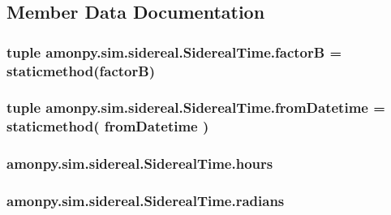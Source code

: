 \subsection{Member Data Documentation}
\hypertarget{classamonpy_1_1sim_1_1sidereal_1_1_sidereal_time_ada951b9a3bf9c8088eca29da084b1a66}{
\subsubsection[{factor\-B}]{\setlength{\rightskip}{0pt plus 5cm}tuple amonpy.\-sim.\-sidereal.\-Sidereal\-Time.\-factor\-B = staticmethod(factor\-B)\hspace{0.3cm}{\ttfamily [static]}}}\label{classamonpy_1_1sim_1_1sidereal_1_1_sidereal_time_ada951b9a3bf9c8088eca29da084b1a66}
\hypertarget{classamonpy_1_1sim_1_1sidereal_1_1_sidereal_time_a5165c3bc081b11b3feec787b838fb2f9}{
\subsubsection[{from\-Datetime}]{\setlength{\rightskip}{0pt plus 5cm}tuple amonpy.\-sim.\-sidereal.\-Sidereal\-Time.\-from\-Datetime = staticmethod( from\-Datetime )\hspace{0.3cm}{\ttfamily [static]}}}\label{classamonpy_1_1sim_1_1sidereal_1_1_sidereal_time_a5165c3bc081b11b3feec787b838fb2f9}
\hypertarget{classamonpy_1_1sim_1_1sidereal_1_1_sidereal_time_abe5bcf1b3b0e8d9e408218bee8c705f1}{
\subsubsection[{hours}]{\setlength{\rightskip}{0pt plus 5cm}amonpy.\-sim.\-sidereal.\-Sidereal\-Time.\-hours}}\label{classamonpy_1_1sim_1_1sidereal_1_1_sidereal_time_abe5bcf1b3b0e8d9e408218bee8c705f1}
\hypertarget{classamonpy_1_1sim_1_1sidereal_1_1_sidereal_time_a4386e1bed24a417f462c060e9ade62f7}{
\subsubsection[{radians}]{\setlength{\rightskip}{0pt plus 5cm}amonpy.\-sim.\-sidereal.\-Sidereal\-Time.\-radians}}\label{classamonpy_1_1sim_1_1sidereal_1_1_sidereal_time_a4386e1bed24a417f462c060e9ade62f7}
